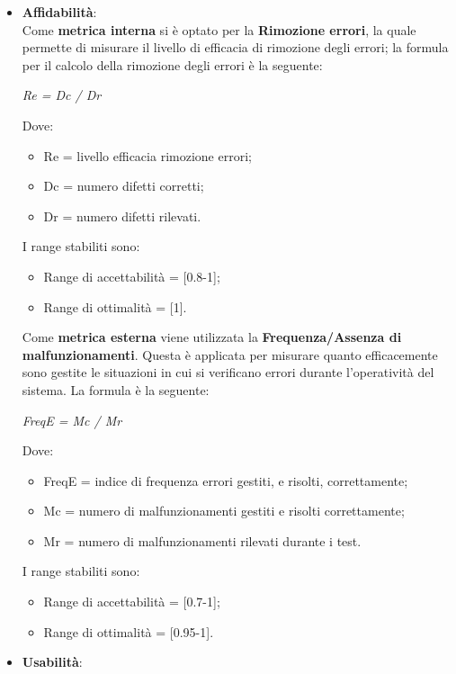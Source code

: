 \begin{itemize}
\begin{itemize}
      \end{itemize}
      \item \textbf{Affidabilità}:\\
      Come \textbf{metrica interna} si è optato per la \textbf{Rimozione errori},
      la quale permette di misurare il livello di efficacia di rimozione degli errori;
      la formula per il calcolo della rimozione degli errori è la seguente:
      \begin{center}
        \emph{Re = Dc / Dr}
      \end{center}
      Dove:
      \begin{itemize}
        \item Re = livello efficacia rimozione errori;
        \item Dc = numero difetti corretti;
        \item Dr = numero difetti rilevati.
      \end{itemize}
      I range stabiliti sono:
      \begin{itemize}
        \item Range di accettabilità = [0.8-1];
        \item Range di ottimalità = [1].
      \end{itemize}
      Come \textbf{metrica esterna} viene utilizzata la \textbf{Frequenza/Assenza di malfunzionamenti}.
      Questa è applicata per misurare quanto efficacemente sono gestite le situazioni in cui si verificano errori durante l'operatività del sistema.
      La formula è la seguente:
      \begin{center}
        \emph{FreqE = Mc / Mr}
      \end{center}
      Dove:
      \begin{itemize}
        \item FreqE = indice di frequenza errori gestiti, e risolti, correttamente;
        \item Mc = numero di malfunzionamenti gestiti e risolti correttamente;
        \item Mr = numero di malfunzionamenti rilevati durante i test.
      \end{itemize}
      I range stabiliti sono:
      \begin{itemize}
        \item Range di accettabilità = [0.7-1];
        \item Range di ottimalità = [0.95-1].
      \end{itemize}
      \item \textbf{Usabilità}:\\

\end{itemize}
